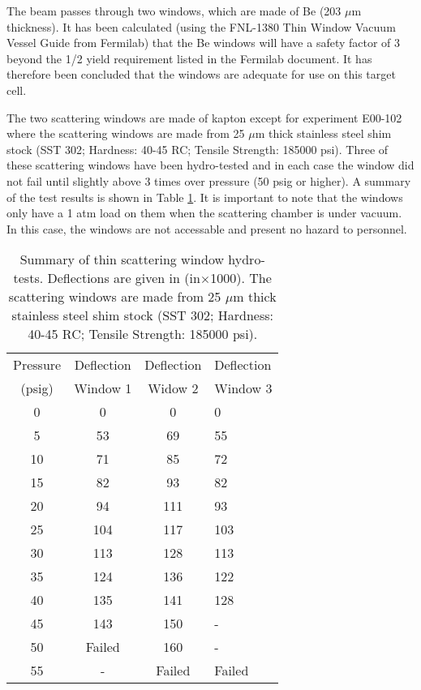 The beam passes through two windows, which are made of Be (203 $\mu $m
thickness). It has been calculated (using the FNL-1380 Thin Window
Vacuum Vessel Guide from Fermilab) that the Be windows will have a
safety factor of 3 beyond the 1/2 yield requirement listed in the
Fermilab document. It has therefore been concluded that the windows
are adequate for use on this target cell.

The two scattering windows are made of kapton except for experiment
E00-102 where the scattering windows are made from 25 $\mu $m thick
stainless steel shim stock (SST 302; Hardness: 40-45 RC; Tensile Strength:
185000 psi). Three of these scattering windows have been hydro-tested
and in each case the window did not fail until slightly above 3 times
over pressure (50 psig or higher). A summary of the test results is
shown in Table \ref{tab: window-table}. It is important to note that
the windows only have a 1 atm load on them when the scattering chamber
is under vacuum. In this case, the windows are not accessable and
present no hazard to personnel.

%
\begin{table}
\begin{center}\begin{tabular}{|c|c|c|p{2in}|}
\hline 
Pressure&
\multicolumn{1}{c|}{Deflection}&
\multicolumn{1}{c|}{Deflection}&
\multicolumn{1}{p{2in}|}{Deflection}\\
(psig)&
\multicolumn{1}{c|}{Window 1}&
Widow 2&
Window 3\\
\hline
\hline 
0&
0&
0&
0\\
\hline
5&
53&
69&
55\\
\hline
10&
71&
85&
72\\
\hline
15&
82&
93&
82\\
\hline
20&
94&
111&
93\\
\hline
25&
104&
117&
103\\
\hline
30&
113&
128&
113\\
\hline
35&
124&
136&
122\\
\hline
40&
135&
141&
128\\
\hline
45&
143&
150&
-\\
\hline
50&
Failed&
160&
-\\
\hline
55&
-&
Failed&
Failed\\
\hline
\end{tabular}\end{center}


\caption{Summary of thin scattering window hydro-tests. Deflections are given
in (in$\times $1000). The scattering windows are made from 25 $\mu $m
thick stainless steel shim stock (SST 302; Hardness: 40-45 RC; Tensile
Strength: 185000 psi). \label{tab: window-table}}
\end{table}



